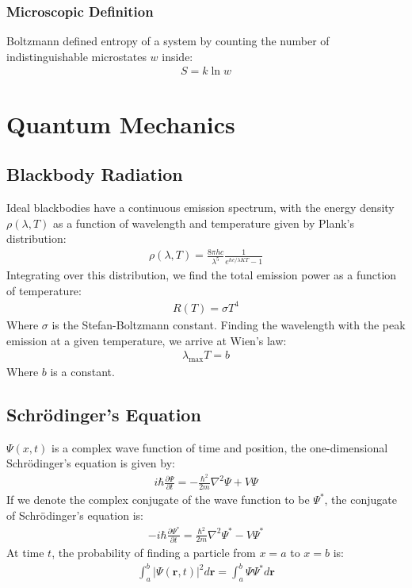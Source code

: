 \documentclass[11pt, letterpaper]{article}
\newcommand{\ve}[1]{
  \ensuremath{\bm{#1}}}	               %
\newcommand{\cc}[1]{
  \ensuremath{#1^{\ast}}}              %
\newcommand{\pd}[2]{
  \ensuremath{
    \frac{\partial #1}{\partial #2} }} %
\begin{document}
\begin{multicols*}{3}
\subsubsection{Microscopic Definition}
Boltzmann defined entropy of a system by counting the number of
indistinguishable microstates $w$ inside:
\begin{align*}
  S = k \ln w
\end{align*}

\section{Quantum Mechanics}
\subsection{Blackbody Radiation}
Ideal blackbodies have a continuous emission spectrum, with the energy density
$\rho (\lambda, T)$ as a function of wavelength and temperature given by Plank's
distribution:
\begin{align*}
  \rho (\lambda, T) = \frac{8\pi h c}{\lambda^5} \frac{1}{e^{hc/\lambda KT} - 1}
\end{align*}
Integrating over this distribution, we find the total emission power as a
function of temperature:
\begin{align*}
  R(T) = \sigma T^4
\end{align*}
Where $\sigma$ is the Stefan-Boltzmann constant. Finding the wavelength with the peak emission at a given temperature, we arrive at Wien's law:
\begin{align*}
  \lambda_\text{max} T = b
\end{align*}
Where $b$ is a constant.
\subsection{Schr\"{o}dinger's Equation}
$\Psi(x, t)$ is a complex wave function of time and position, the
one-dimensional Schr\"{o}dinger's equation is given by:
\begin{align*}
  i \hbar \pd{\Psi}{t} = - \frac{\hbar^2}{2m} \nabla^2 \Psi + V\Psi
\end{align*}
If we denote the complex conjugate of the wave function to be $\cc{\Psi}$, the
conjugate of Schr\"{o}dinger's equation is:
\begin{align*}
  -i \hbar \pd{\cc{\Psi}}{t} = \frac{\hbar^2}{2m} \nabla^2 \cc{\Psi} -
  V\cc{\Psi}
\end{align*}
At time $t$, the probability of finding a particle from $x=a$ to $x=b$ is:
\begin{align*}
  \int_{a}^{b} |\Psi(\ve{r}, t)|^2 d\ve{r} = \int_{a}^{b}\Psi\cc{\Psi}d\ve{r}
\end{align*}

\end{multicols*}
\end{document}
